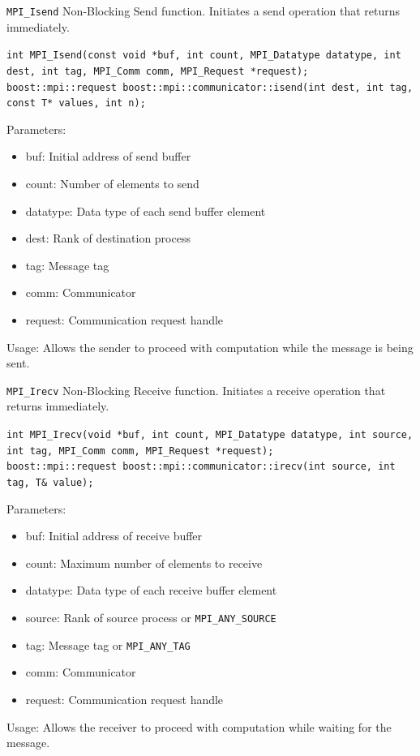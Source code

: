\documentclass{beamer}
\begin{document}
\begin{frame}{\texttt{MPI\_Isend}}
  Non-Blocking Send function. Initiates a send operation that returns immediately.

  {
    \footnotesize
    \texttt{int MPI\_Isend(const void *buf, int count, MPI\_Datatype datatype, int dest, int tag, MPI\_Comm comm, MPI\_Request *request);} \\
    \texttt{boost::mpi::request boost::mpi::communicator::isend(int dest, int tag, const T* values, int n);}
  }

  Parameters:

  \begin{itemize}
    \item buf: Initial address of send buffer
    \item count: Number of elements to send
    \item datatype: Data type of each send buffer element
    \item dest: Rank of destination process
    \item tag: Message tag
    \item comm: Communicator
    \item request: Communication request handle
  \end{itemize}
  {\footnotesize Usage: Allows the sender to proceed with computation while the message is being sent.}
\end{frame}

\begin{frame}{\texttt{MPI\_Irecv}}
  Non-Blocking Receive function. Initiates a receive operation that returns immediately.

  {
    \footnotesize
    \texttt{int MPI\_Irecv(void *buf, int count, MPI\_Datatype datatype, int source, int tag, MPI\_Comm comm, MPI\_Request *request);} \\
    \texttt{boost::mpi::request boost::mpi::communicator::irecv(int source, int tag, T\& value);}
  }

  Parameters:

  \begin{itemize}
    \item buf: Initial address of receive buffer
    \item count: Maximum number of elements to receive
    \item datatype: Data type of each receive buffer element
    \item source: Rank of source process or \texttt{MPI\_ANY\_SOURCE}
    \item tag: Message tag or \texttt{MPI\_ANY\_TAG}
    \item comm: Communicator
    \item request: Communication request handle
  \end{itemize}
  {\footnotesize Usage: Allows the receiver to proceed with computation while waiting for the message.}
\end{frame}
\end{document}
